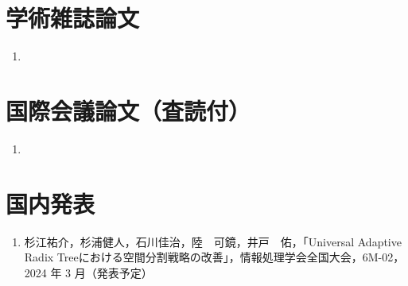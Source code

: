 
\publications

\section*{学術雑誌論文}

\begin{enumerate}
  \item
\end{enumerate}



\section*{国際会議論文（査読付）}

\begin{enumerate}
  \item
\end{enumerate}



\section*{国内発表}

\begin{enumerate}
  \item 杉江祐介，杉浦健人，石川佳治，陸　可鏡，井戸　佑，「Universal Adaptive Radix Treeにおける空間分割戦略の改善」，情報処理学会全国大会，6M-02，2024 年 3 月（発表予定）
\end{enumerate}
